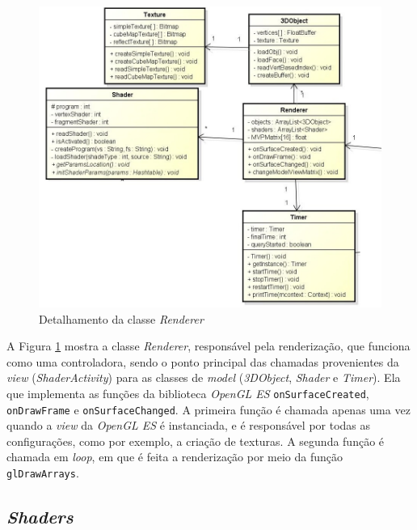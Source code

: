 	\begin{figure}[h!]
	\centering
		\includegraphics[keepaspectratio=true,scale=0.6]{figuras/renderer.jpg}
	\caption{Detalhamento da classe \textit{Renderer}}
	\label{renderer}
	\end{figure}

	A Figura \ref{renderer} mostra a classe \textit{Renderer}, responsável pela renderização, que funciona como uma controladora, sendo o ponto principal  das chamadas provenientes da \textit{view} (\textit{ShaderActivity}) para as classes de \textit{model} (\textit{3DObject}, \textit{Shader} e \textit{Timer}). Ela que implementa as funções da biblioteca \textit{OpenGL ES} \texttt{onSurfaceCreated},  \texttt{onDrawFrame} e \texttt{onSurfaceChanged}. A primeira função é chamada apenas uma vez quando a \textit{view} da \textit{OpenGL ES} é instanciada, e é responsável por todas as configurações, como por exemplo, a criação de texturas. A segunda função é chamada em \textit{loop}, em que é feita a renderização por meio da função \texttt{glDrawArrays}. 

\subsection{\textit{Shaders}}      

